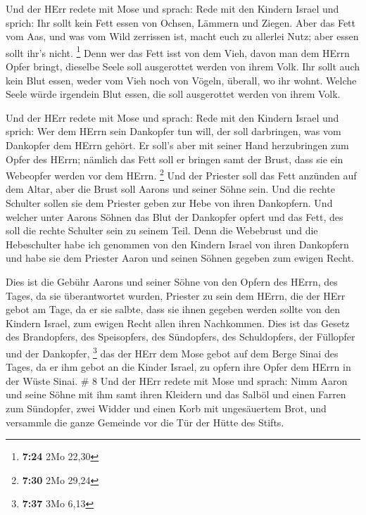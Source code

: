  Und der HErr redete mit Mose und sprach: 
Rede mit den Kindern Israel und sprich: Ihr sollt kein Fett essen von
Ochsen, Lämmern und Ziegen.  Aber das Fett vom Aas, und was
vom Wild zerrissen ist, macht euch zu allerlei Nutz; aber essen sollt
ihr's nicht. \footnote{\textbf{7:24} 2Mo 22,30}  Denn wer
das Fett isst von dem Vieh, davon man dem HErrn Opfer bringt, dieselbe
Seele soll ausgerottet werden von ihrem Volk.  Ihr sollt
auch kein Blut essen, weder vom Vieh noch von Vögeln, überall, wo ihr
wohnt.  Welche Seele würde irgendein Blut essen, die soll
ausgerottet werden von ihrem Volk.

 Und der HErr redete mit Mose und sprach: 
Rede mit den Kindern Israel und sprich: Wer dem HErrn sein Dankopfer tun
will, der soll darbringen, was vom Dankopfer dem HErrn gehört.
 Er soll's aber mit seiner Hand herzubringen zum Opfer des
HErrn; nämlich das Fett soll er bringen samt der Brust, dass sie ein
Webeopfer werden vor dem HErrn. \footnote{\textbf{7:30} 2Mo 29,24}
 Und der Priester soll das Fett anzünden auf dem Altar,
aber die Brust soll Aarons und seiner Söhne sein.  Und die
rechte Schulter sollen sie dem Priester geben zur Hebe von ihren
Dankopfern.  Und welcher unter Aarons Söhnen das Blut der
Dankopfer opfert und das Fett, des soll die rechte Schulter sein zu
seinem Teil.  Denn die Webebrust und die Hebeschulter habe
ich genommen von den Kindern Israel von ihren Dankopfern und habe sie
dem Priester Aaron und seinen Söhnen gegeben zum ewigen Recht.

 Dies ist die Gebühr Aarons und seiner Söhne von den Opfern
des HErrn, des Tages, da sie überantwortet wurden, Priester zu sein dem
HErrn,  die der HErr gebot am Tage, da er sie salbte, dass
sie ihnen gegeben werden sollte von den Kindern Israel, zum ewigen Recht
allen ihren Nachkommen.  Dies ist das Gesetz des
Brandopfers, des Speisopfers, des Sündopfers, des Schuldopfers, der
Füllopfer und der Dankopfer, \footnote{\textbf{7:37} 3Mo 6,13}
 das der HErr dem Mose gebot auf dem Berge Sinai des Tages,
da er ihm gebot an die Kinder Israel, zu opfern ihre Opfer dem HErrn in
der Wüste Sinai. \# 8  Und der HErr redete mit Mose und
sprach:  Nimm Aaron und seine Söhne mit ihm samt ihren
Kleidern und das Salböl und einen Farren zum Sündopfer, zwei Widder und
einen Korb mit ungesäuertem Brot,  und versammle die ganze
Gemeinde vor die Tür der Hütte des Stifts.

